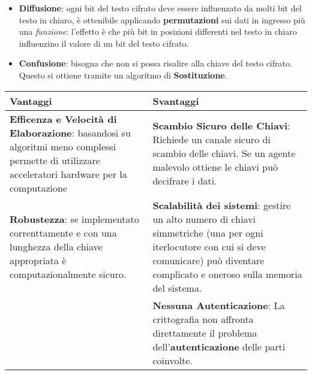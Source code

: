 \begin{itemize}
    \item \textbf{Diffusione}: ogni bit del testo cifrato deve essere influenzato da molti bit del testo in chiaro, è ottenibile applicando \textbf{permutazioni} sui dati in ingresso più una \textit{funzione}: l'effetto è che più bit in posizioni differenti nel testo in chiaro influenzino il valore di un bit del testo cifrato.
    \item \textbf{Confusione}: bisogna che non si possa risalire alla chiave del testo cifrato. Questo si ottiene tramite un algoritmo di \textbf{Sostituzione}.
\end{itemize}
\newpage
\begin{table}[ht]
    \centering
    \begin{tabular}[h]{| p{8cm} | p{8cm} |} \hline

        \textbf{Vantaggi} & \textbf{Svantaggi} \\ \hline
        \textbf{Efficenza e Velocità di Elaborazione}: basandosi su algoritmi meno complessi permette di utilizzare acceleratori hardware per la computazione & \textbf{Scambio Sicuro delle Chiavi}: Richiede un canale sicuro di scambio delle chiavi. Se un agente malevolo ottiene le chiavi può decifrare i dati. \\ \hline
        \textbf{Robustezza}: se implementato correnttamente e con una lunghezza della chiave appropriata è computazionalmente sicuro. & \textbf{Scalabilità dei sistemi}: gestire un alto numero di chiavi simmetriche (una per ogni iterlocutore con cui si deve comunicare) può diventare complicato e oneroso sulla memoria del sistema. \\ \hline
        & \textbf{Nessuna Autenticazione}: La crittografia non affronta direttamente il problema dell'\textbf{autenticazione} delle parti coinvolte. \\ \hline

    \end{tabular}
\end{table}

